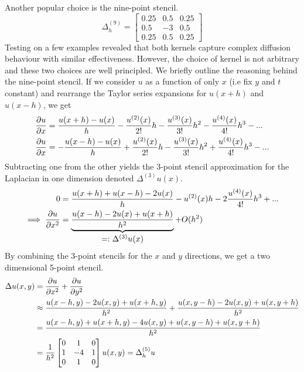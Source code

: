 Another popular choice is the nine-point stencil\cite{rosser1975nine}.
\[
  \Delta^{(9)}_h = \begin{bmatrix}
    0.25 & 0.5 & 0.25\\
    0.5 & -3 & 0.5\\
    0.25 & 0.5 & 0.25
  \end{bmatrix}
\]
Testing on a few examples revealed that both kernels capture complex diffusion behaviour with similar effectiveness. However, the choice of kernel is not arbitrary and these two choices are well principled. We briefly outline the reasoning behind the nine-point stencil. If we consider $u$ as a function of only $x$ (i.e fix $y$ and $t$ constant) and rearrange the Taylor series expansions for $u(x+h)$ and $u(x-h)$, we get
\begin{align*}
  \pdv{u}{x} &= \frac{u(x+h) - u(x)}{h} - \frac{u^{(2)}(x)}{2!}h - \frac{u^{(3)}(x)}{3!}h^2 - \frac{u^{(4)}(x)}{4!}h^3 - ... \\
  \pdv{u}{x} &= - \frac{u(x-h) - u(x)}{h} + \frac{u^{(2)}(x)}{2!}h - \frac{u^{(3)}(x)}{3!}h^2 + \frac{u^{(4)}(x)}{4!}h^3 - ...
\end{align*}
Subtracting one from the other yields the 3-point stencil approximation for the Laplacian in one dimension denoted $\Delta^{(3)}u(x)$.
\begin{align*}
  0 &= \frac{u(x+h) + u(x-h) - 2u(x)}{h} - u^{(2)}(x)h - 2\frac{u^{(4)}(x)}{4!}h^3 + ...\\
  \implies \pdv{u}{x^2} &=  \underbrace{\frac{u(x-h) -2u(x) + u(x+h)}{h^2}}_{\let\scriptstyle\textstyle
  \substack{=: \Delta^{(3)}u(x)}} + O(h^2)
\end{align*}
By combining the 3-point stencils for the $x$ and $y$ directions, we get a two dimensional 5-point stencil.
\begin{align*}
  \Delta u(x, y) &= \pdv{u}{x^2} + \pdv{u}{y^2}\\
                     &\approx \frac{u(x-h, y) -2u(x, y) + u(x+h, y)}{h^2} + \frac{u(x, y-h) -2u(x, y) + u(x, y+h)}{h^2}\\
                     &= \frac{u(x-h, y)+ u(x+h, y) -4u(x, y) + u(x, y-h) + u(x, y+h)}{h^2}\\
                     &= \frac{1}{h^2} \begin{bmatrix}
                                0 & 1 & 0\\
                                1 & -4 & 1\\
                                0 & 1 & 0
                     \end{bmatrix} u(x, y) = \Delta^{(5)}_h u
\end{align*}
